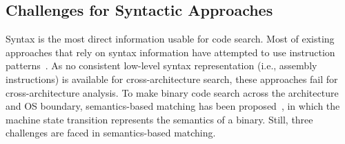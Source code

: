 \subsection{Challenges for Syntactic Approaches}\label{sec:back:challenge}
Syntax is the most direct information usable for code search.
Most of existing approaches that rely on syntax information have attempted to use instruction patterns~\cite{DBLP:conf/uss/JangWB13,DBLP:conf/raid/KrugelKMRV05,saebjornsen2009detecting,DBLP:conf/pldi/DavidY14}.
As no consistent low-level syntax representation (i.e., assembly instructions) is available for cross-architecture search, these approaches fail for cross-architecture analysis. %
To make binary code search across the architecture and OS boundary, semantics-based matching has been proposed~\cite{luo2014semantics,DBLP:conf/sp/PewnyGGRH15}, in which the machine state transition represents the semantics of a binary. Still, three challenges are faced in semantics-based matching.


